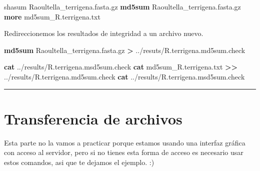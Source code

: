 \documentclass[
]{book}
\newenvironment{Shaded}{\begin{snugshade}}{\end{snugshade}}
\newcommand{\ExtensionTok}[1]{#1}
\newcommand{\FunctionTok}[1]{\textcolor[rgb]{0.13,0.29,0.53}{\textbf{#1}}}
\newcommand{\NormalTok}[1]{#1}
\newcommand{\OperatorTok}[1]{\textcolor[rgb]{0.81,0.36,0.00}{\textbf{#1}}}
\begin{document}
\begin{Shaded}
\begin{Highlighting}[]
\ExtensionTok{shasum}\NormalTok{ Raoultella\_terrigena.fasta.gz}
\FunctionTok{md5sum}\NormalTok{ Raoultella\_terrigena.fasta.gz}
\FunctionTok{more}\NormalTok{ md5sum\_R.terrigena.txt}
\end{Highlighting}
\end{Shaded}

Redireccionemos los resultados de integridad a un archivo nuevo.

\begin{Shaded}
\begin{Highlighting}[]
\FunctionTok{md5sum}\NormalTok{ Raoultella\_terrigena.fasta.gz }\OperatorTok{\textgreater{}}
\ExtensionTok{../resuts/R.terrigena.md5sum.check}

\FunctionTok{cat}\NormalTok{ ../results/R.terrigena.msd5sum.check}
\FunctionTok{cat}\NormalTok{ md5sum\_R.terrigena.txt }\OperatorTok{\textgreater{}\textgreater{}}\NormalTok{ ../results/R.terrigena.md5sum.check}
\FunctionTok{cat}\NormalTok{ ../results/R.terrigena.msd5sum.check}
\end{Highlighting}
\end{Shaded}

\begin{center}\rule{0.5\linewidth}{0.5pt}\end{center}

\section{Transferencia de archivos}\label{transferencia-de-archivos}

Esta parte no la vamos a practicar porque estamos usando una interfaz gráfica con acceso al servidor, pero si no tienes esta forma de acceso es necesario usar estos comandos, asi que te dejamos el ejemplo. :)
\end{document}
